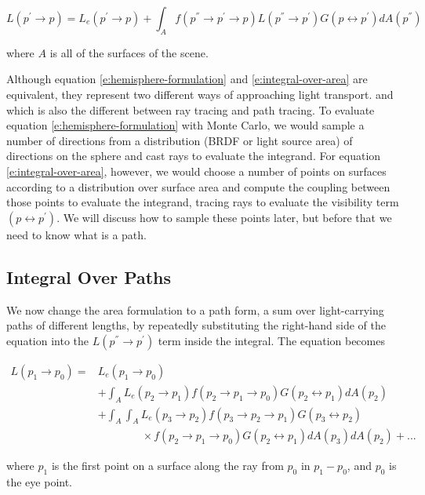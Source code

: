 \begin{equation}\label{e:integral-over-area}
	L(p^{'}\to p)=L_e(p^{'}\to p)+\int_A f(p^{''}\to p^{'}\to p)L(p^{''}\to p^{'})G(p\leftrightarrow p^{'})dA(p^{''})
\end{equation}

where $A$ is all of the surfaces of the scene.

Although equation \ref{e:hemisphere-formulation} and \ref{e:integral-over-area} are equivalent, they represent two different ways of approaching light transport. and which is also the different between ray tracing and path tracing. To evaluate equation \ref{e:hemisphere-formulation} with Monte Carlo, we would sample a number of directions from a distribution (BRDF or light source area) of directions on the sphere and cast rays to evaluate the integrand. For equation \ref{e:integral-over-area}, however, we would choose a number of points on surfaces according to a distribution over surface area and compute the coupling between those points to evaluate the integrand, tracing rays to evaluate the visibility term $(p\leftrightarrow p^{'})$. We will discuss how to sample these points later, but before that we need to know what is a path.



\subsection{Integral Over Paths}
We now change the area formulation to a path form, a sum over light-carrying paths of different lengths, by repeatedly substituting the right-hand side of the equation into the $L(p^{''}\to p^{'})$ term inside the integral. The equation becomes

\begin{equation*}
	\begin{aligned}
		L(p_1\to p_0)=&L_e(p_1\to p_0)\\
		&+\int_AL_e(p_2\to p_1)f(p_2\to p_1\to p_0)G(p_2\leftrightarrow p_1)dA(p_2)\\
		&+\int_A\int_A L_e(p_3\to p_2)f(p_3\to p_2\to p_1)G(p_3\leftrightarrow p_2)\\
		&\qquad\qquad \times f(p_2\to p_1\to p_0)G(p_2\leftrightarrow p_1)dA(p_3)dA(p_2)+...
	\end{aligned}
\end{equation*}

where $p_1$ is the first point on a surface along the ray from $p_0$ in $p_1-p_0$, and $p_0$ is the eye point.

